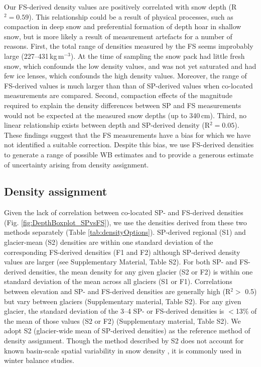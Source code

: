 \documentclass[twocolumn, letterpaper]{igs}
\begin{document}
Our FS-derived density values are positively correlated with snow depth (R$^2= 0.59$). This relationship could be a result of physical processes, such as compaction in deep snow and preferential formation of depth hoar in shallow snow, but is more likely a result of measurement artefacts for a number of reasons. First, the total range of densities measured by the FS seems improbably large (227--431\,kg\,m$^{-3}$). At the time of sampling the snow pack had little fresh snow, which confounds the low density values, and was not yet saturated and had few ice lenses, which confounds the high density values. Moreover, the range of FS-derived values is much larger than than of SP-derived values when co-located measurements are compared. Second, compaction effects of the magnitude required to explain the density differences between SP and FS measurements would not be expected at the measured snow depths (up to 340\,cm). Third, no linear relationship exists between depth and SP-derived density (R$^2 = 0.05$). These findings suggest that the FS measurements have a bias for which we have not identified a suitable correction. Despite this bias, we use FS-derived densities to generate a range of possible WB estimates and to provide a generous estimate of uncertainty arising from density assignment.

\subsection{Density assignment}

Given the lack of correlation between co-located SP- and FS-derived densities (Fig. \ref{fig:DepthBoxplot_SPvsFS}), we use the densities derived from these two methods separately (Table \ref{tab:densityOptions}). SP-derived regional (S1) and glacier-mean (S2) densities are within one standard deviation of the corresponding FS-derived densities (F1 and F2) although SP-derived density values are larger (see Supplementary Material, Table S2). For both SP- and FS-derived densities, the mean density for any given glacier (S2 or F2) is within one standard deviation of the mean across all glaciers (S1 or F1). Correlations between elevation and SP- and FS-derived densities are generally high (R$^2>$ 0.5) but vary between glaciers (Supplementary material, Table S2). For any given glacier, the standard deviation of the 3--4 SP- or FS-derived densities is $<$13\% of the mean of those values (S2 or F2) (Supplementary material, Table S2). We adopt S2 (glacier-wide mean of SP-derived densities) as the reference method of density assignment. Though the method described by S2 does not account for known basin-scale spatial variability in snow density \citep[e.g.][]{Wetlaufer2016}, it is commonly used in winter balance studies\citep[e.g.][]{Elder1991,McGrath2015,Cullen2017}. 
\end{document}
